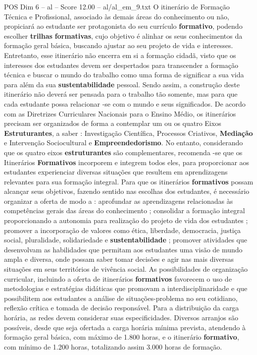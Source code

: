 \begin{textsample}{POS Dim 6 – al – Score 12.00 – al/al\_em\_9.txt}
O itinerário de Formação Técnica e Profissional, associado às demais áreas do conhecimento ou não, propiciará ao estudante ser protagonista do seu currículo \textbf{formativo}, podendo escolher \textbf{trilhas} \textbf{formativas}, cujo objetivo é alinhar os seus conhecimentos da formação geral básica, buscando ajustar ao seu projeto de vida e interesses.
Entretanto, esse itinerário não encerra em si a formação cidadã, visto que os interesses dos estudantes devem ser despertados para transcender a formação técnica e buscar o mundo do trabalho como uma forma de significar a sua vida para além da sua \textbf{sustentabilidade} pessoal.
Sendo assim, a construção deste itinerário não deverá ser pensada para o trabalho tão somente, mas para que cada estudante possa relacionar -se com o mundo e seus significados.
De acordo com as Diretrizes Curriculares Nacionais para o Ensino Médio, os itinerários precisam ser organizados de forma a contemplar um ou os quatro Eixos \textbf{Estruturantes}, a saber : Investigação Científica, Processos Criativos, \textbf{Mediação} e Intervenção Sociocultural e \textbf{Empreendedorismo}.
No entanto, considerando que os quatro eixos \textbf{estruturantes} são complementares, recomenda -se que os Itinerários \textbf{Formativos} incorporem e integrem todos eles, para proporcionar aos estudantes experienciar diversas situações que resultem em aprendizagens relevantes para sua formação integral.
Para que os itinerários \textbf{formativos} possam alcançar seus objetivos, fazendo sentido nas escolhas dos estudantes, é necessário organizar a oferta de modo a : aprofundar as aprendizagens relacionadas às competências gerais das áreas do conhecimento ; consolidar a formação integral proporcionando a autonomia para realização do projeto de vida dos estudantes ; promover a incorporação de valores como ética, liberdade, democracia, justiça social, pluralidade, solidariedade e \textbf{sustentabilidade} ; promover atividades que desenvolvam as habilidades que permitam aos estudantes uma visão de mundo ampla e diversa, onde possam saber tomar decisões e agir nas mais diversas situações em seus territórios de vivência social.
As possibilidades de organização curricular, incluindo a oferta de itinerários \textbf{formativos} favorecem o uso de metodologias e estratégias didáticas que promovam a interdisciplinaridade e que possibilitem aos estudantes a análise de situações-problema no seu cotidiano, reflexão crítica e tomada de decisão responsável.
Para a distribuição da carga horária, as redes devem considerar suas especificidades.
Diversos arranjos são possíveis, desde que seja ofertada a carga horária mínima prevista, atendendo à formação geral básica, com máximo de 1.800 horas, e o itinerário \textbf{formativo}, com mínimo de 1.200 horas, totalizando assim 3.000 horas de formação.

\end{textsample}
